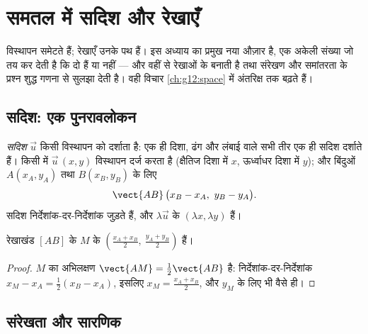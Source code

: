 \chapter{समतल में सदिश और रेखाएँ}\label{ch:g11:vect}

 विस्थापन समेटते हैं; रेखाएँ उनके पथ हैं। इस अध्याय का प्रमुख नया औज़ार
\emph{} है, एक अकेली संख्या जो तय कर देती है कि दो   हैं या
नहीं --- और वहीं से रेखाओं के  बनाती है तथा संरेखण और समांतरता के
प्रश्न शुद्ध गणना से सुलझा देती है। वही विचार \cref{ch:g12:space} में अंतरिक्ष तक बढ़ते हैं।

\section{सदिश: एक पुनरावलोकन}

\begin{definition}[सदिश, निर्देशांक]\label{def:g11:vect:vector}
\emph{सदिश} $\vec u$ किसी विस्थापन को दर्शाता है: एक ही दिशा, ढंग और
लंबाई वाले सभी तीर एक ही सदिश दर्शाते हैं। किसी  में $\vec u\,(x, y)$
विस्थापन दर्ज करता है (क्षैतिज दिशा में $x$, ऊर्ध्वाधर दिशा में $y$); और
बिंदुओं $A(x_A, y_A)$ तथा $B(x_B, y_B)$ के लिए
\[
\vect{AB}\,\bigl(x_B - x_A,\ y_B - y_A\bigr).
\]
सदिश निर्देशांक-दर-निर्देशांक जुड़ते हैं, और $\lambda\vec u$ के  $(\lambda x, \lambda y)$ हैं।
\end{definition}

\begin{proposition}[मध्यबिंदु]\label{prop:g11:vect:midpoint}
रेखाखंड $[AB]$ के  $M$ के  $\left(\frac{x_A + x_B}{2},\ \frac{y_A + y_B}{2}\right)$ हैं।
\end{proposition}

\begin{proof}
$M$ का अभिलक्षण $\vect{AM} = \frac12\vect{AB}$ है: निर्देशांक-दर-निर्देशांक $x_M - x_A = \frac12(x_B - x_A)$, इसलिए $x_M = \frac{x_A + x_B}{2}$, और
$y_M$ के लिए भी वैसे ही।
\end{proof}

\section{संरेखता और सारणिक}

